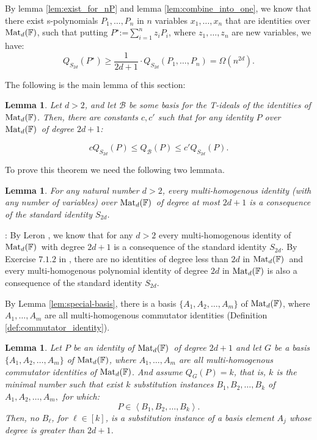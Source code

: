 \documentclass[12pt,reqno]{article}
\newtheorem{lemma}[theorem]{Lemma}
\renewcommand{\dot}[1]{{#1}^\star}
\newcommand\F{\ensuremath{\mathbb F}}
\newcommand{\cd}{\cdot}
\renewcommand{\l}{\ell}
\newcommand{\matd}{{\ensuremath{{\rm Mat}_d(\F)}}}
\newenvironment{proof}{\QuadSpace\par\noindent{\bf Proof}:}{\EndProof\HalfSpace}
\newcommand{\QuadSpace}{\vspace{0.25\baselineskip}}
\newcommand{\HalfSpace}{\vspace{0.5\baselineskip}}
\newcommand{\EndProof}{ \hfill \vrule width 1ex height 1ex depth 0pt }
\newcommand{\nx}[1]{#1_1,\ldots,#1_{n}}
\renewcommand{\t}[1]{\overline{#1}}
\newcommand{\ideal}[1]{\ensuremath{\left\langle #1\right\rangle}}
\begin{document}

By lemma \ref{lem:exist_for_nP} and lemma \ref{lem:combine_into_one}, we know that there exist s-polynomials $\nx{P}$ in $n$ variables $\nx{x}$ that are identities over  \matd, such that putting  $\dot{P}$:=$\sum_{i=1}^n z_iP_i$, where  $\nx{z}$ are new variables, we have:
$$Q_{S_{2d}}(\dot{P})\geq\frac{1}{2d+1}\cd Q_{S_{2d}}(\nx{P})=\Omega(n^{2d}).$$
\medskip

The following is the main lemma of this section:
\begin{lemma}\label{lem:relation-S-2d-Matd}
  Let $d>2$, and let $\mathcal B$ be some basis for the T-ideals of the identities of \matd. Then, there are constants $c,c'$ such that for any identity $P$ over \matd\ of   degree $2d+1$:

  $$  c Q_{S_{2d}}(P)\le Q_{\mathcal B}(P)\le c' Q_{S_{2d}}(P).$$

\end{lemma}

To prove this theorem we need
the following two lemmata.
\begin{lemma}\label{lem:generated-by-S_2d}
For any natural number $d>2$, every multi-homogenous identity  (with any number of variables) over \matd\ of degree at most $2d+1$ is a consequence of the standard identity $S_{2d}$.
\end{lemma}
\begin{proof}
By Leron \cite{Ler73}, we know that  for any  $d>2$ every multi-homogenous identity of \matd\ with degree $2d+1$  is a consequence of the standard identity $S_{2d}$. By Exercise $7.1.2$ in  \cite{Dre99}, there are no identities of degree less than $2d$ in \matd\ and  every multi-homogenous polynomial identity of degree $2d$  in  $\matd$ is also a consequence of the standard identity $S_{2d}$.
\end{proof}

By Lemma \ref{lem:special-basis}, there is a basis  $\{A_1,A_2,\ldots,A_{m}\}$ of $\matd$, where $A_1,\ldots,A_m$ are all multi-homogenous commutator identities (Definition \ref{def:commutator_identity}).

\begin{lemma}\label{lem:2d+2-cant-generate}
Let $P$  be an identity of \matd\ of degree $2d+1$ and let $G$ be a basis  $\{A_1,A_2,\ldots,A_m\}$ of $\matd$, where $A_1,\ldots,A_m$ are all multi-homogenous  commutator identities of \matd. And assume $Q_{G}(P)=k$, that is, $k$ is the minimal number such that exist $k$ substitution instances $B_1,B_2,\ldots,B_k$ of $A_1,A_2,\ldots,A_m,$ for which:
$$P\in \ideal{B_1,B_2,\ldots,B_k}.$$
Then, no $B_\l$, for $\l\in[k]$, is a substitution instance of a basis element $A_j$ whose degree  is  greater than $2d+1$.
\end{lemma}
\end{document}
